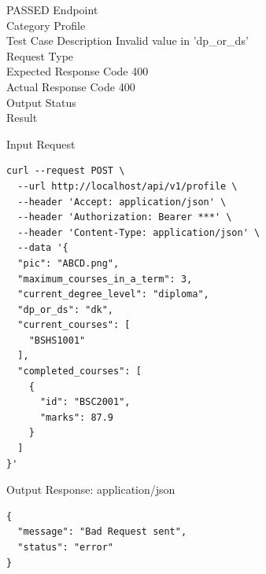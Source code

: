 \begin{testcase}{14}{PASSED}
Endpoint \hfill {}\\
Category \hfill Profile\\
Test Case Description \hfill Invalid value in 'dp\_or\_ds'\\

Request Type    \hfill {}\\
Expected Response Code    \hfill 400\\
Actual Response Code    \hfill 400\\

Output Status \hfill {}\\
Result \hfill {}

\begin{ipblock}{Input Request}
\begin{verbatim}
curl --request POST \
  --url http://localhost/api/v1/profile \
  --header 'Accept: application/json' \
  --header 'Authorization: Bearer ***' \
  --header 'Content-Type: application/json' \
  --data '{
  "pic": "ABCD.png",
  "maximum_courses_in_a_term": 3,
  "current_degree_level": "diploma",
  "dp_or_ds": "dk",
  "current_courses": [
    "BSHS1001"
  ],
  "completed_courses": [
    {
      "id": "BSC2001",
      "marks": 87.9
    }
  ]
}'
\end{verbatim}
\end{ipblock}

\begin{opblock}{Output Response: application/json}
\begin{verbatim}
{
  "message": "Bad Request sent",
  "status": "error"
}
\end{verbatim}
\end{opblock}
\end{testcase}


